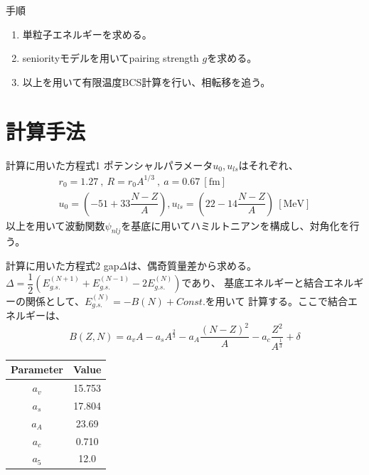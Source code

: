 \documentclass[aspectratio=169, 12pt, dvipdfmx]{beamer}
\begin{document}
\begin{frame}{手順}
  \begin{enumerate}
    \item 単粒子エネルギーを求める。
    \item seniorityモデルを用いてpairing strength $g$を求める。
    \item 以上を用いて有限温度BCS計算を行い、相転移を追う。
  \end{enumerate}
\end{frame}

\section{計算手法}

\begin{frame}{計算に用いた方程式1}
  ポテンシャルパラメータ$u_{0},u_{ls}$はそれぞれ、
  \begin{align}
    r_0=1.27\ ,\ R=r_0A^{1/3}\ ,\ a=0.67\ [\text{fm}]\\
    u_0=\left(-51+33\dfrac{N-Z}{A}\right),u_{ls}=\left(22-14\dfrac{N-Z}{A} \right)\ [\text{MeV}]
  \end{align}
    以上を用いて波動関数$\psi_{nlj}$を基底に用いてハミルトニアンを構成し、対角化を行う。
\end{frame}

\begin{frame}{計算に用いた方程式2}
  gap$\Delta$は、偶奇質量差から求める。$\Delta=\dfrac{1}{2}(E_{g.s.}^{(N+1)}+E_{g.s.}^{(N-1)}-2E_{g.s.}^{(N)})$であり、
  基底エネルギーと結合エネルギーの関係として、$E_{g.s.}^{(N)}=-B(N)+Const.$を用いて
  計算する。ここで結合エネルギーは、
  \begin{equation}
    B(Z, N) = a_v A - a_s A^{\frac{2}{3}} - a_A \frac{(N - Z)^2}{A} - a_c \frac{Z^2}{A^{\frac{1}{3}}} + \delta
  \end{equation}
  \begin{table}[]
    \centering
    \begin{tabular}{c|c}
        Parameter & Value \\
        \hline
        \( a_v \) & 15.753 \\
        \( a_s \) & 17.804 \\
        \( a_A \) & 23.69 \\
        \( a_c \) & 0.710 \\
        \( a_5 \) & 12.0 \\
    \end{tabular}
  \end{table}
\end{frame}
\end{document}
